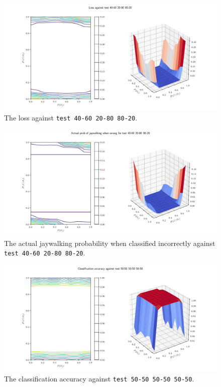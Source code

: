 \documentclass[]{report}
\newcommand{\code}{\texttt}
\begin{document}
\begin{figure}[h]
    \centering
    \centerline{\includegraphics[scale=0.55]{test_40-60_20-80_80-20_loss.png}}
    \caption[]{The loss against \code{test 40-60 20-80 80-20}.}
    \label{fig:test_40-60_20-80_80-20_loss_plot}
\end{figure}

\begin{figure}[h]
    \centering
    \centerline{\includegraphics[scale=0.55]{test_40-60_20-80_80-20_jay_prob.png}}
    \caption[]{The actual jaywalking probability when classified incorrectly against \code{test 40-60 20-80 80-20}.}
    \label{fig:test_40-60_20-80_80-20_jay_prob_plot}
\end{figure}

% 
% 

\begin{figure}[h]
    \centering
    \centerline{\includegraphics[scale=0.55]{test_50-50_50-50_50-50_accuracy.png}}
    \caption[]{The classification accuracy against \code{test 50-50 50-50 50-50}.}
    \label{fig:test_50-50_50-50_50-50_accuracy_plot}
\end{figure}
\end{document}
